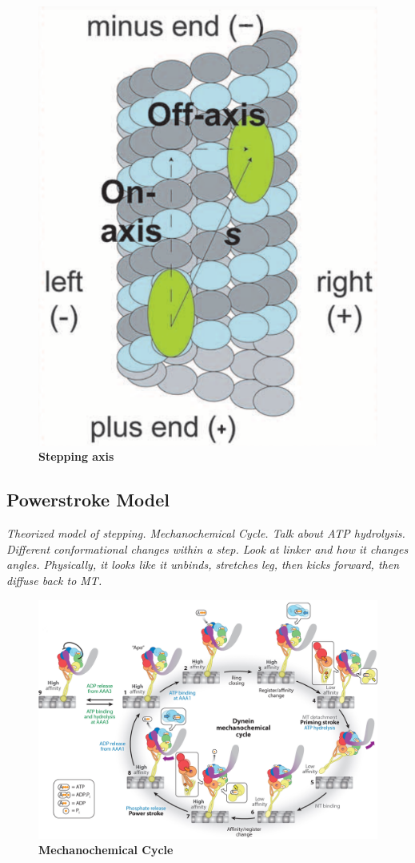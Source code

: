 \begin{figure}[H]
	\centering
	\includegraphics[width=0.3\columnwidth]{Figures/Onaxis.png}
	\caption[Stepping Axis]{\textbf{Stepping axis}  \cite{Dewitt2012} }
	\label{fig:YildizCorrelation}
\end{figure}


\subsection{Powerstroke Model}
\textit{Theorized model of stepping. Mechanochemical Cycle. Talk about ATP hydrolysis. Different conformational changes within a step. Look at linker and how it changes angles. Physically, it looks like it unbinds, stretches leg, then kicks forward, then diffuse back to MT.} 

\begin{figure}[H]
	\centering
	\includegraphics[width=1\columnwidth]{Figures/mechanochemical_cycle.jpeg}
	\caption[Mechanochemical Cycle]{\textbf{Mechanochemical Cycle}  \cite{Cianfrocco2015mechanism}}
	\label{fig:MechanochemicalCycle}
\end{figure}

